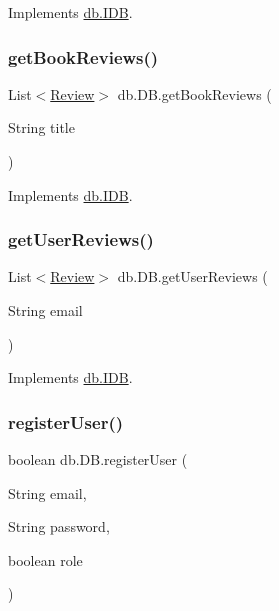 Implements \hyperlink{interfacedb_1_1_i_d_b_a39ad15619eae3d0ec652e1849e3ebd50}{db.\+I\+DB}.

\mbox{\label{classdb_1_1_d_b_a02a42ee97d8e7189733dfc720a05452e}} 
\subsubsection{\texorpdfstring{get\+Book\+Reviews()}{getBookReviews()}}
{\footnotesize\ttfamily List$<$\hyperlink{classserver_1_1data_1_1_review}{Review}$>$ db.\+D\+B.\+get\+Book\+Reviews (\begin{DoxyParamCaption}\item[{String}]{title }\end{DoxyParamCaption})}



Implements \hyperlink{interfacedb_1_1_i_d_b_a6b8fda48df77b542b8713bc4f035bccf}{db.\+I\+DB}.

\mbox{\label{classdb_1_1_d_b_a9ef4c302b91da17852f09a27a90fb4b5}} 
\subsubsection{\texorpdfstring{get\+User\+Reviews()}{getUserReviews()}}
{\footnotesize\ttfamily List$<$\hyperlink{classserver_1_1data_1_1_review}{Review}$>$ db.\+D\+B.\+get\+User\+Reviews (\begin{DoxyParamCaption}\item[{String}]{email }\end{DoxyParamCaption})}



Implements \hyperlink{interfacedb_1_1_i_d_b_afd7ee8924344c13a64a1363d1a295771}{db.\+I\+DB}.

\mbox{\label{classdb_1_1_d_b_a76fac3ed38eaecd5a073224d6ad51332}} 
\subsubsection{\texorpdfstring{register\+User()}{registerUser()}\hspace{0.1cm}{\footnotesize\ttfamily [1/2]}}
{\footnotesize\ttfamily boolean db.\+D\+B.\+register\+User (\begin{DoxyParamCaption}\item[{String}]{email,  }\item[{String}]{password,  }\item[{boolean}]{role }\end{DoxyParamCaption})}




